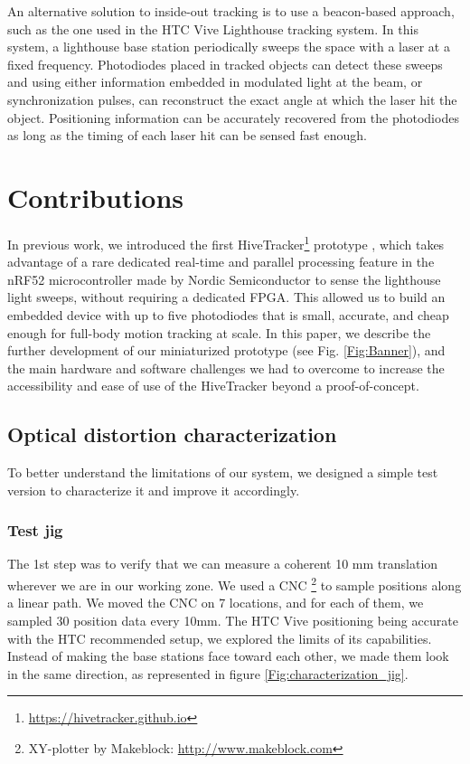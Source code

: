 \documentclass[sigchi]{acmart}
\begin{document}
An alternative solution to inside-out tracking is to use a beacon-based approach, such as the one used in the HTC Vive Lighthouse tracking system. In this system, a lighthouse base station periodically sweeps the space with a laser at a fixed frequency. Photodiodes placed in tracked objects can detect these sweeps and using either information embedded in modulated light at the beam, or synchronization pulses, can reconstruct the exact angle at which the laser hit the object. Positioning information can be accurately recovered from the photodiodes as long as the timing of each laser hit can be sensed fast enough.


\section{Contributions}

In previous work, we introduced the first HiveTracker\footnote{\url{https://hivetracker.github.io}} prototype \cite{Quinones2018}, which takes advantage of a rare dedicated real-time and parallel processing feature in the nRF52 microcontroller made by Nordic Semiconductor to sense the lighthouse light sweeps, without requiring a dedicated FPGA. This allowed us to build an embedded device with up to five photodiodes that is small, accurate, and cheap enough for full-body motion tracking at scale.
\newline \newline
In this paper, we describe the further development of our miniaturized prototype (see Fig. \ref{Fig:Banner}), and the main hardware and software challenges we had to overcome to increase the accessibility and ease of use of the HiveTracker beyond a proof-of-concept.


\subsection{Optical distortion characterization}

To better understand the limitations of our system, we designed a simple test version to characterize it and improve it accordingly.

\subsubsection{Test jig}
The 1st step was to verify that we can measure a coherent 10 mm translation wherever we are in our working zone.
We used a CNC \footnote{XY-plotter by Makeblock: \url{http://www.makeblock.com}} to sample positions along a
linear path. We moved the CNC on 7 locations, and for each of them, we sampled 30 position data every 10mm.
The HTC Vive positioning being accurate with the HTC recommended setup, we explored the limits of its capabilities.
Instead of making the base stations face toward each other, we made them look in the same direction, as
represented in figure \ref{Fig:characterization_jig}.
\end{document}
